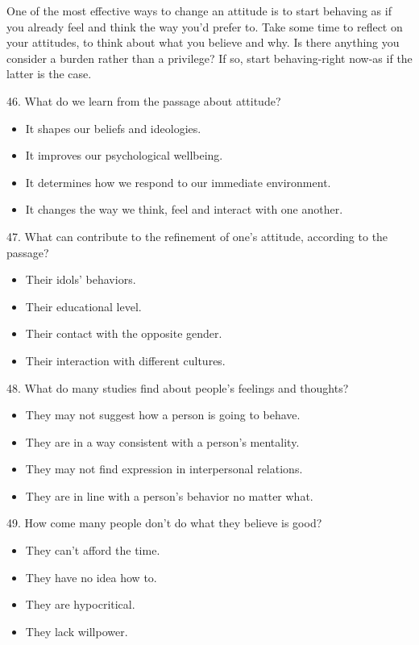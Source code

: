 \documentclass[UTF8,11pt]{ctexart}
\begin{document}
One of the most effective ways to change an attitude is to start behaving as if you already feel and think the way you'd prefer to. Take some time to reflect on your attitudes, to think about what you believe and why. Is there anything you consider a burden rather than a privilege? If so, start behaving-right now-as if the latter is the case.


46. What do we learn from the passage about attitude?


\begin{itemize}[leftmargin=2em,itemsep=.2em,topsep=.4em]\item[A.] It shapes our beliefs and ideologies.
\item[B.] It improves our psychological wellbeing.
\item[C.] It determines how we respond to our immediate environment.
\item[D.] It changes the way we think, feel and interact with one another.
\end{itemize}

47. What can contribute to the refinement of one's attitude, according to the passage?


\begin{itemize}[leftmargin=2em,itemsep=.2em,topsep=.4em]\item[A.] Their idols' behaviors.
\item[B.] Their educational level.
\item[C.] Their contact with the opposite gender.
\item[D.] Their interaction with different cultures.
\end{itemize}

48. What do many studies find about people's feelings and thoughts?


\begin{itemize}[leftmargin=2em,itemsep=.2em,topsep=.4em]\item[A.] They may not suggest how a person is going to behave.
\item[B.] They are in a way consistent with a person's mentality.
\item[C.] They may not find expression in interpersonal relations.
\item[D.] They are in line with a person's behavior no matter what.
\end{itemize}

49. How come many people don't do what they believe is good?


\begin{itemize}[leftmargin=2em,itemsep=.2em,topsep=.4em]\item[A.] They can't afford the time.
\item[B.] They have no idea how to.
\item[C.] They are hypocritical.
\item[D.] They lack willpower.
\end{itemize}
\end{document}
